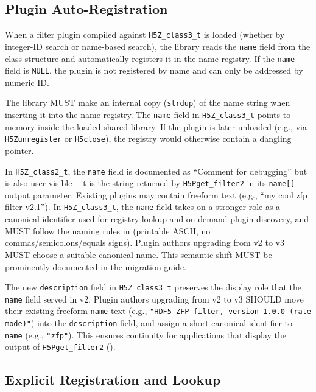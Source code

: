 \documentclass[../HDF5_RFC.tex]{subfiles}
\begin{document}
\subsection{Plugin Auto-Registration}

When a filter plugin compiled against \texttt{H5Z\_class3\_t} is loaded (whether by
integer-ID search or name-based search), the library reads the \texttt{name} field
from the class structure and automatically registers it in the name registry.
If the \texttt{name} field is \texttt{NULL}, the plugin is not registered by name and can
only be addressed by numeric ID.

The library MUST make an internal copy (\texttt{strdup}) of the name string when
inserting it into the name registry. The \texttt{name} field in \texttt{H5Z\_class3\_t} points
to memory inside the loaded shared library. If the plugin is later unloaded
(e.g., via \texttt{H5Zunregister} or \texttt{H5close}), the registry would otherwise
contain a dangling pointer.

In \texttt{H5Z\_class2\_t}, the \texttt{name} field is
documented as ``Comment for debugging'' but is also user-visible---it is the
string returned by \texttt{H5Pget\_filter2} in its \texttt{name[]} output parameter.
Existing plugins may contain freeform text (e.g., ``my cool zfp filter v2.1'').
In \texttt{H5Z\_class3\_t}, the \texttt{name} field takes on a stronger role as a canonical
identifier used for registry lookup and on-demand plugin discovery, and MUST
follow the naming rules in  (printable ASCII, no
commas/semicolons/equals signs). Plugin authors upgrading from v2 to v3 MUST
choose a suitable canonical name. This semantic shift MUST be prominently
documented in the migration guide.

The new \texttt{description} field in \texttt{H5Z\_class3\_t} preserves the display
role that the \texttt{name} field served in v2. Plugin authors upgrading from v2
to v3 SHOULD move their existing freeform \texttt{name} text (e.g.,
\texttt{"HDF5 ZFP filter, version 1.0.0 (rate mode)"}) into the
\texttt{description} field, and assign a short canonical identifier to
\texttt{name} (e.g., \texttt{"zfp"}). This ensures continuity for applications
that display the output of \texttt{H5Pget\_filter2}
().


\subsection{Explicit Registration and Lookup}
\label{sec:explicit-registration}
\end{document}
